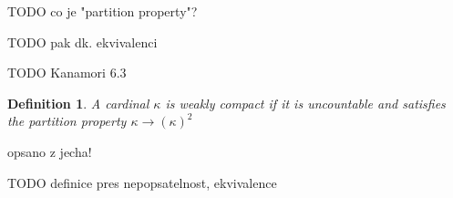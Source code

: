 \documentclass[12pt,a4paper]{article}
\newtheorem{theorem}{Theorem}[section]
\newtheorem{definition}[theorem]{Definition}
\newtheorem{lemma}[theorem]{Lemma}
\newenvironment{proof}
{\noindent \textit{Proof.}}
{\hspace*{\fill} $\Box$}
\newcommand{\then}{\rightarrow}
\begin{document}
TODO co je "partition property"?

TODO pak dk. ekvivalenci

TODO Kanamori 6.3

\begin{definition}
A cardinal $\kappa$ is \emph{weakly compact} if it is uncountable and satisfies the partition property $\kappa \then (\kappa)^2$
\end{definition}
{\color{red}
opsano z jecha!

TODO definice pres nepopsatelnost, ekvivalence

\begin{comment}

\begin{lemma}
Every weakly compact cardinal is inaccessible
\end{lemma}

\begin{proof}
Let $\kappa$ b a~weakly compact cardinal. To show that $\kappa$ is regular, let us assume that $\kappa$ i the disjoint union
$\bigcup\{A_{\gamma}: \gamma < \lambda\}$ such that $\lambda < \kappa$ and $|A_{\gamma}| < \kappa$ for each $\gamma < \lambda$.
 We define a~partition $F: [\kappa]^2 \then \{0, 1\}$ as follows: $F(\{\alpha, \beta\}) = 0$ just in cas $\alpha$ and $\beta$ are the same size $A_{\gamma}$. Obviously, this partition does not have a~homogenous set $H \subset \kappa$ of size $\kappa$.
That $\kappa$ is a~strong limit cardinal follows from Lemma 9.4: (?? doplnit z jecha): If $\kappa \geq 2^{\lambda}$ for some $\lambda < \kappa$,
the because $2^{\lambda} \leq (\lambda^{+})^2$, we have $\kappa \leq (\lambda^{+})^2$ and hence $\kappa \leq (\kappa)^2$.
\end{proof}

\

\end{comment}
}

{\color{red}
\begin{comment}


\begin{theorem}\label{th:refl_weakly_compact}
Let $\kappa$ be a~weakly compact cardinal. Then for every stationary set $S \subset \kappa$ there is an uncountable regular cardinal $\lambda < \kappa$ such that the set $S \cap \lambda$ is stationary in $\lambda$.
\end{theorem}
\begin{proof}
TODO
\end{proof}

\


\begin{definition}[Indescribability]
For Q either $\Pi^m_n$ or $\Sigma^m_n$\newline
A cardinal $\kappa$ is \emph{$Q-indescribable$} if whenever
$U \subseteq V_\kappa$ and $\varphi$ is a~Q sentence such that $\langle V_\kappa, \in, U \rangle \models \varphi$, then for some $\alpha < \kappa$, $\langle V_\alpha, \in, U \cap V_\alpha \rangle \models \varphi$.
\end{definition}

\end{comment}
}
\end{document}
